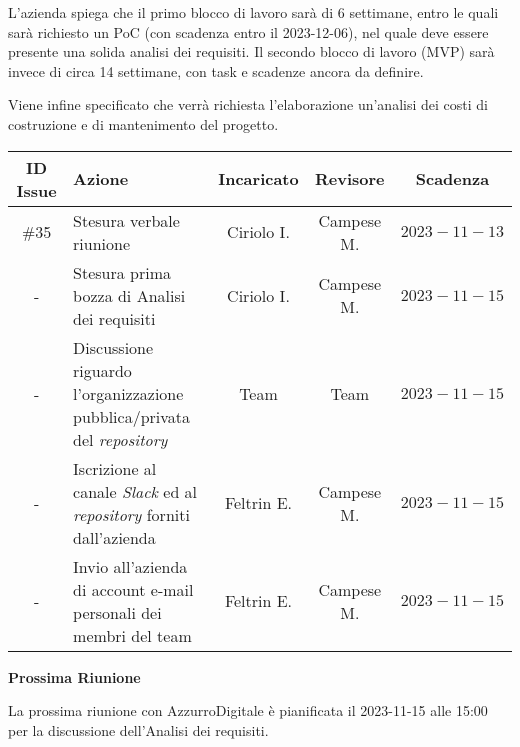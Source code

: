 \documentclass[10pt, a4paper]{article}
\begin{document}
\begin{paracol}{2}
L'azienda spiega che il primo blocco di lavoro sarà di 6 settimane, entro le quali sarà richiesto un PoC (con scadenza entro il 2023-12-06), nel quale deve essere presente una solida analisi dei requisiti. Il secondo blocco di lavoro (MVP) sarà invece di circa 14 settimane, con task e scadenze ancora da definire.

Viene infine specificato che verrà richiesta l'elaborazione un'analisi dei costi di costruzione e di mantenimento del progetto.

\vspace{12.5em}

\decisioni

\end{paracol}

\newpage


{\renewcommand{\arraystretch}{1.5}
\begin{tabularx}{\textwidth}{c|X|c|c|c}
\textbf{ID Issue} & \textbf{Azione} & \textbf{Incaricato} & \textbf{Revisore} & \textbf{Scadenza} \\
\hline
\#35 &
Stesura verbale riunione &
Ciriolo I. &
Campese M. &
$2023-11-13$ \\
\hline
- &
Stesura prima bozza di Analisi dei requisiti &
Ciriolo I. &
Campese M. &
$2023-11-15$ \\
\hline
- &
Discussione riguardo l'organizzazione pubblica/privata del \textit{repository} &
Team &
Team &
$2023-11-15$ \\
\hline
- &
Iscrizione al canale \textit{Slack} ed al \textit{repository} forniti dall'azienda &
Feltrin E. &
Campese M. &
$2023-11-15$ \\
\hline
- &
Invio all'azienda di account e-mail personali dei membri del team &
Feltrin E. &
Campese M. &
$2023-11-15$ \\
\end{tabularx}}

\vspace{3em}


\textbf{Prossima Riunione}

La prossima riunione con AzzurroDigitale è pianificata il 2023-11-15 alle 15:00 per la discussione dell'Analisi dei requisiti.
\end{document}
